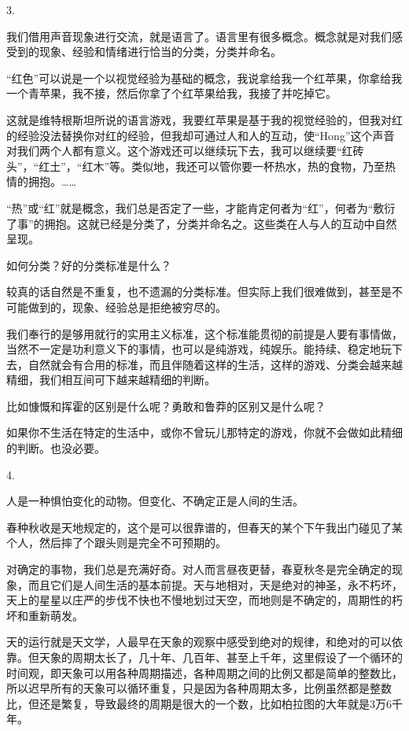 3.

我们借用声音现象进行交流，就是语言了。语言里有很多概念。概念就是对我们感受到的现象、经验和情绪进行恰当的分类，分类并命名。

“红色”可以说是一个以视觉经验为基础的概念，我说拿给我一个红苹果，你拿给我一个青苹果，我不接，然后你拿了个红苹果给我，我接了并吃掉它。

这就是维特根斯坦所说的语言游戏，我要红苹果是基于我的视觉经验的，但我对红的经验没法替换你对红的经验，但我却可通过人和人的互动，使“Hong”这个声音对我们两个人都有意义。这个游戏还可以继续玩下去，我可以继续要“红砖头”，“红土”，“红木”等。类似地，我还可以管你要一杯热水，热的食物，乃至热情的拥抱。……

“热”或“红”就是概念，我们总是否定了一些，才能肯定何者为“红”，何者为“敷衍了事”的拥抱。这就已经是分类了，分类并命名之。这些类在人与人的互动中自然呈现。

如何分类？好的分类标准是什么？

较真的话自然是不重复，也不遗漏的分类标准。但实际上我们很难做到，甚至是不可能做到的，现象、经验总是拒绝被穷尽的。

我们奉行的是够用就行的实用主义标准，这个标准能贯彻的前提是人要有事情做，当然不一定是功利意义下的事情，也可以是纯游戏，纯娱乐。能持续、稳定地玩下去，自然就会有合用的标准，而且伴随着这样的生活，这样的游戏、分类会越来越精细，我们相互间可下越来越精细的判断。

比如慷慨和挥霍的区别是什么呢？勇敢和鲁莽的区别又是什么呢？

如果你不生活在特定的生活中，或你不曾玩儿那特定的游戏，你就不会做如此精细的判断。也没必要。

4.

人是一种惧怕变化的动物。但变化、不确定正是人间的生活。

春种秋收是天地规定的，这个是可以很靠谱的，但春天的某个下午我出门碰见了某个人，然后摔了个跟头则是完全不可预期的。

对确定的事物，我们总是充满好奇。对人而言昼夜更替，春夏秋冬是完全确定的现象，而且它们是人间生活的基本前提。天与地相对，天是绝对的神圣，永不朽坏，天上的星星以庄严的步伐不快也不慢地划过天空，而地则是不确定的，周期性的朽坏和重新萌发。

天的运行就是天文学，人最早在天象的观察中感受到绝对的规律，和绝对的可以依靠。但天象的周期太长了，几十年、几百年、甚至上千年，这里假设了一个循环的时间观，即天象可以用各种周期描述，各种周期之间的比例又都是简单的整数比，所以迟早所有的天象可以循环重复，只是因为各种周期太多，比例虽然都是整数比，但还是繁复，导致最终的周期是很大的一个数，比如柏拉图的大年就是3万6千年。

